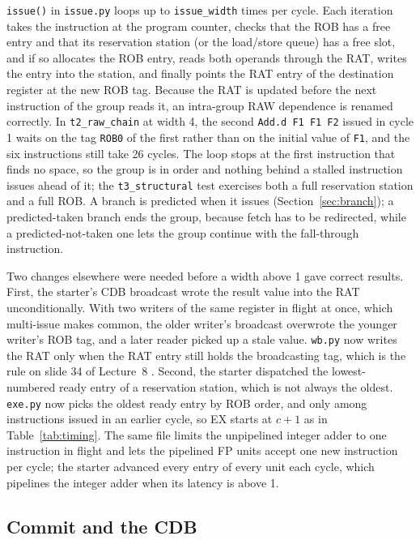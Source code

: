 \documentclass[11pt]{article}
\newcommand{\code}[1]{\texttt{#1}}
\begin{document}
\code{issue()} in \code{issue.py} loops up to \code{issue\_width} times per cycle. Each
iteration takes the instruction at the program counter, checks that the ROB has a free
entry and that its reservation station (or the load/store queue) has a free slot, and if so
allocates the ROB entry, reads both operands through the RAT, writes the entry into the
station, and finally points the RAT entry of the destination register at the new ROB tag.
Because the RAT is updated before the next instruction of the group reads it, an intra-group
RAW dependence is renamed correctly. In \code{t2\_raw\_chain} at width 4, the second
\code{Add.d F1 F1 F2} issued in cycle 1 waits on the tag \code{ROB0} of the first rather than
on the initial value of \code{F1}, and the six instructions still take 26 cycles. The loop
stops at the first instruction that finds no space, so the group is in order and nothing
behind a stalled instruction issues ahead of it; the \code{t3\_structural} test exercises both
a full reservation station and a full ROB. A branch is predicted when it issues
(Section~\ref{sec:branch}); a predicted-taken branch ends the group, because fetch has to be
redirected, while a predicted-not-taken one lets the group continue with the fall-through
instruction.

Two changes elsewhere were needed before a width above 1 gave correct results. First, the
starter's CDB broadcast wrote the result value into the RAT unconditionally. With two
writers of the same register in flight at once, which multi-issue makes common, the
older writer's broadcast overwrote the younger writer's ROB tag, and a later reader picked up
a stale value. \code{wb.py} now writes the RAT only when the RAT entry still holds the
broadcasting tag, which is the rule on slide 34 of Lecture~8 \cite{lec8}. Second, the
starter dispatched the lowest-numbered ready entry of a reservation station, which is not
always the oldest. \code{exe.py} now picks the oldest ready entry by ROB
order, and only among instructions issued in an earlier cycle, so EX starts at $c+1$ as in
Table~\ref{tab:timing}. The same file limits the unpipelined integer adder to one instruction
in flight and lets the pipelined FP units accept one new instruction per cycle; the starter
advanced every entry of every unit each cycle, which pipelines the integer adder when its
latency is above 1.

\subsection{Commit and the CDB}
\end{document}
